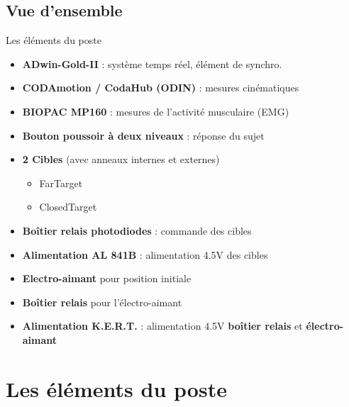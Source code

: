 \documentclass[a4paper,11pt]{beamer}
\begin{document}
\subsection{Vue d'ensemble}
\begin{frame}
\begin{block}{Les éléments du poste}
\begin{itemize}
	\item \textbf{ADwin-Gold-II} : système temps réel, élément de synchro.
	\item \textbf{CODAmotion / CodaHub (ODIN)} : mesures cinématiques
	\item \textbf{BIOPAC MP160} : mesures de l'activité musculaire (EMG)
	\item \textbf{Bouton poussoir à deux niveaux} : réponse du sujet
	\item \textbf{2 Cibles} (avec anneaux internes et externes)
	\begin{itemize}
		\item FarTarget
		\item ClosedTarget
	\end{itemize}
	\item \textbf{Boîtier relais photodiodes} : commande des cibles
	\item \textbf{Alimentation AL 841B} : alimentation 4.5V des cibles
	\item \textbf{Electro-aimant} pour position initiale
	\item \textbf{Boîtier relais} pour l'électro-aimant
	\item \textbf{Alimentation K.E.R.T.} : alimentation 4.5V \textbf{boîtier relais} et \textbf{électro-aimant}
\end{itemize}
\end{block}
\end{frame}

\section{Les éléments du poste}
\end{document}

